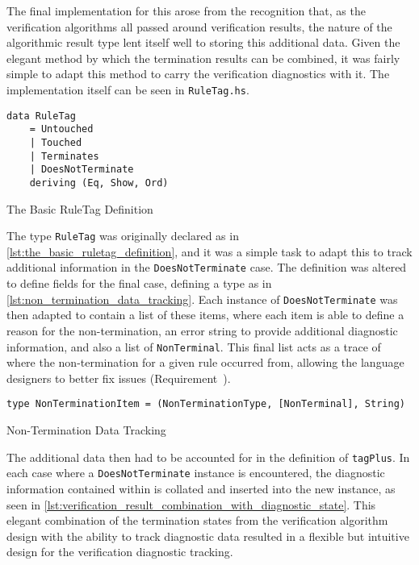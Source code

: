 The final implementation for this arose from the recognition that, as the verification algorithms all passed around verification results, the nature of the algorithmic result type lent itself well to storing this additional data. 
Given the elegant method by which the termination results can be combined, it was fairly simple to adapt this method to carry the verification diagnostics with it.
The implementation itself can be seen in \texttt{RuleTag.hs}.

\begin{listing}[!htb]
\begin{verbatim}
data RuleTag
    = Untouched
    | Touched
    | Terminates
    | DoesNotTerminate
    deriving (Eq, Show, Ord)
\end{verbatim}
\caption{The Basic RuleTag Definition}
\label{lst:the_basic_ruletag_definition}
\end{listing}

The type \texttt{RuleTag} was originally declared as in \autoref{lst:the_basic_ruletag_definition}, and it was a simple task to adapt this to track additional information in the \texttt{DoesNotTerminate} case.
The definition was altered to define fields for the final case, defining a type as in \autoref{lst:non_termination_data_tracking}.
Each instance of \texttt{DoesNotTerminate} was then adapted to contain a list of these items, where each item is able to define a reason for the non-termination, an error string to provide additional diagnostic information, and also a list of \texttt{NonTerminal}.
This final list acts as a trace of where the non-termination for a given rule occurred from, allowing the language designers to better fix issues (Requirement~).

\begin{listing}[!htb]
\begin{verbatim}
type NonTerminationItem = (NonTerminationType, [NonTerminal], String)
\end{verbatim}
\caption{Non-Termination Data Tracking}
\label{lst:non_termination_data_tracking}
\end{listing}

The additional data then had to be accounted for in the definition of \texttt{tagPlus}.
In each case where a \texttt{DoesNotTerminate} instance is encountered, the diagnostic information contained within is collated and inserted into the new instance, as seen in \autoref{lst:verification_result_combination_with_diagnostic_state}.
This elegant combination of the termination states from the verification algorithm design with the ability to track diagnostic data resulted in a flexible but intuitive design for the verification diagnostic tracking.

